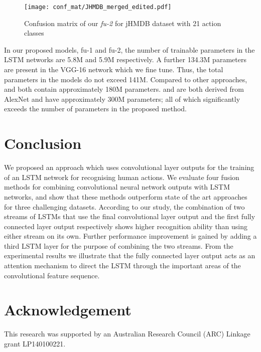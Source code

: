 \documentclass[10pt,twocolumn,letterpaper]{article}
\begin{document}
 \begin{figure}[!h]
 \vspace{-2 mm}
        \begin{flushleft}
        	\texttt{[image: conf\_mat/JHMDB\_merged\_edited.pdf]}
	\vspace{-5 mm}
	\caption{Confusion matrix of our \textit{fu-2} for jHMDB dataset with 21 action classes}
	\label{fig:fig4}
        \end{flushleft}
        \vspace{-4 mm}
  \end{figure}
 \vspace{-5 mm}  
In our proposed models, fu-1 and fu-2, the number of trainable parameters in the LSTM networks are 5.8M and 5.9M respectively. A further 134.3M parameters are present in the VGG-16 network which we fine tune. Thus, the total parameters in the models do not exceed 141M. Compared to other approaches, \cite{actiontubes} and \cite{Simonyan2014} both contain approximately 180M parameters. \cite{Jeff2015} and \cite{Ravanbakhsh15} are both derived from AlexNet and have approximately 300M parameters; all of which significantly exceeds the number of parameters in the proposed method. 

\section{Conclusion} 

  We proposed an approach which uses convolutional layer outputs for the training of an LSTM network for recognising human actions. We evaluate four fusion methods for combining convolutional neural network outputs with LSTM networks, and show that these methods outperform state of the art approaches for three challenging datasets. According to our study, the combination of two streams of LSTMs that use the final convolutional layer output and the first fully connected layer output respectively shows higher recognition ability than using either stream on its own. Further performance improvement is gained by adding a third LSTM layer for the purpose of combining the two streams. From the experimental results we illustrate that the fully connected layer output acts as an attention mechanism to direct the LSTM through the important areas of the convolutional feature sequence.


\section*{Acknowledgement}
This research was supported by an Australian Research Council (ARC) Linkage grant LP140100221.  
  
 


{\small


}
\end{document}

